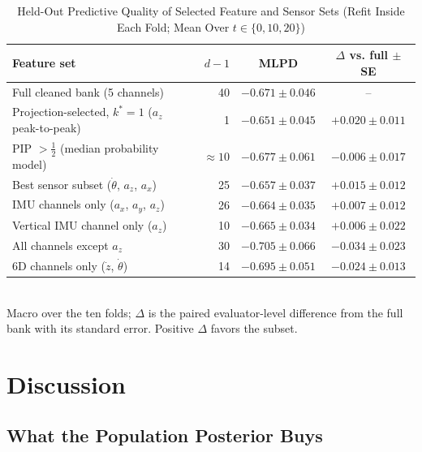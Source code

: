 \documentclass[lettersize,journal]{IEEEtran}
\begin{document}
\begin{table}[t]
\caption{Held-Out Predictive Quality of Selected Feature and Sensor Sets (Refit Inside Each Fold; Mean Over $t\in\{0,10,20\}$)}
\label{tab:sensors}
\centering
\setlength{\tabcolsep}{3.5pt}
\begin{tabular}{lrcc}
\toprule
Feature set & $d-1$ & MLPD & $\Delta$ vs. full $\pm$ SE \\
\midrule
Full cleaned bank (5 channels) & 40 & $-0.671\pm0.046$ & -- \\
Projection-selected, $k^\ast=1$ ($a_z$ peak-to-peak) & 1 & $-0.651\pm0.045$ & $+0.020\pm0.011$ \\
PIP $>\tfrac12$ (median probability model) & $\approx10$ & $-0.677\pm0.061$ & $-0.006\pm0.017$ \\
Best sensor subset ($\dot\theta$, $a_z$, $a_x$) & 25 & $-0.657\pm0.037$ & $+0.015\pm0.012$ \\
IMU channels only ($a_x$, $a_y$, $a_z$) & 26 & $-0.664\pm0.035$ & $+0.007\pm0.012$ \\
Vertical IMU channel only ($a_z$) & 10 & $-0.665\pm0.034$ & $+0.006\pm0.022$ \\
All channels except $a_z$ & 30 & $-0.705\pm0.066$ & $-0.034\pm0.023$ \\
6D channels only ($\dot z$, $\dot\theta$) & 14 & $-0.695\pm0.051$ & $-0.024\pm0.013$ \\
\bottomrule
\end{tabular}
\\[2pt]
{\footnotesize Macro over the ten folds; $\Delta$ is the paired evaluator-level difference from the full bank with its standard error. Positive $\Delta$ favors the subset.}
\end{table}

\section{Discussion}
\label{sec:discussion}

\subsection{What the Population Posterior Buys}
\end{document}
